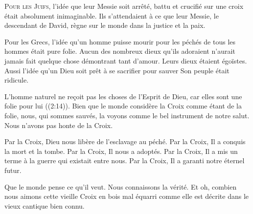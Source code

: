 \dvrule






\lettrine{P}{our les Juifs}, l'idée que leur Messie soit arrêté,
 battu et crucifié sur une croix était absolument inimaginable.
 Ils s'attendaient à ce que leur Messie, le descendant de David,
 règne sur le monde dans la justice et la paix.

Pour les Grecs, l'idée qu'un homme puisse mourir pour les péchés
 de tous les hommes était pure folie. Aucun des nombreux dieux
 qu'ils adoraient n'aurait jamais fait quelque chose démontrant tant d'amour.
 Leurs dieux étaient égoïstes. Aussi l'idée qu'un Dieu soit prêt
 à se sacrifier pour sauver Son peuple était ridicule.

\Og L'homme naturel ne re\c{c}oit pas les choses de l'Esprit de Dieu,
 car elles sont une folie pour lui \Fg{} ((2:14)).
 Bien que le monde considère la Croix comme étant de la folie, nous,
 qui sommes sauvés, la voyons comme le bel instrument de notre salut.
 Nous n'avons pas honte de la Croix.


Par la Croix, Dieu nous libère de l'esclavage au péché.
 Par la Croix, Il a conquis la mort et la tombe.
 Par la Croix, Il nous a adoptés.
 Par la Croix, Il a mis un terme à la guerre qui existait entre nous.
 Par la Croix, Il a garanti notre éternel futur.

Que le monde pense ce qu'il veut. Nous connaissons la vérité.
 Et oh, combien nous aimons cette \Og vieille Croix en bois mal équarri \Fg{}
 comme elle est décrite dans le vieux cantique bien connu.

\dvrule



